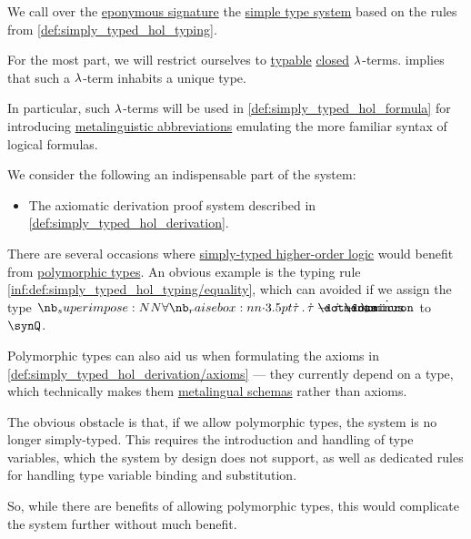 \begin{definition}\label{def:simply_typed_hol}
  We call  over the \hyperref[def:simply_typed_hol_signature]{eponymous signature} the \hyperref[def:simple_type_system]{simple type system} based on the rules from \cref{def:simply_typed_hol_typing}.

  For the most part, we will restrict ourselves to \hyperref[def:typability]{typable} \hyperref[def:lambda_combinator]{closed} \( {\mathrm \lambda} \)-terms.  implies that such a \( {\mathrm \lambda} \)-term inhabits a unique type.

  In particular, such \( {\mathrm \lambda} \)-terms will be used in \cref{def:simply_typed_hol_formula} for introducing \hyperref[con:metalingual_abbreviation]{metalinguistic abbreviations} emulating the more familiar syntax of logical formulas.
\end{definition}
\begin{comments}
  \item We consider the following an indispensable part of the system:
  \begin{itemize}
    \item The axiomatic derivation proof system described in \cref{def:simply_typed_hol_derivation}.
  \end{itemize}
\end{comments}

\begin{remark}\label{rem:simply_typed_hol_polymorphic_types}
  There are several occasions where \hyperref[def:simply_typed_hol]{simply-typed higher-order logic} would benefit from \hyperref[def:polymorphic_typed_lambda_calculus]{polymorphic types}. An obvious example is the typing rule \ref{inf:def:simply_typed_hol_typing/equality}, which can avoided if we assign the type \( \qpolytype {\syn\tau} \syn\tau \synimplies \syn\tau \synimplies \syn\omicron \) to \( \synQ \).

  Polymorphic types can also aid us when formulating the axioms in \ref{def:simply_typed_hol_derivation/axioms} --- they currently depend on a type, which technically makes them \hyperref[con:schemas_and_instances]{metalingual schemas} rather than axioms.

  The obvious obstacle is that, if we allow polymorphic types, the system is no longer simply-typed. This requires the introduction and handling of type variables, which the system by design does not support, as well as dedicated rules for handling type variable binding and substitution.

  So, while there are benefits of allowing polymorphic types, this would complicate the system further without much benefit.
\end{remark}

